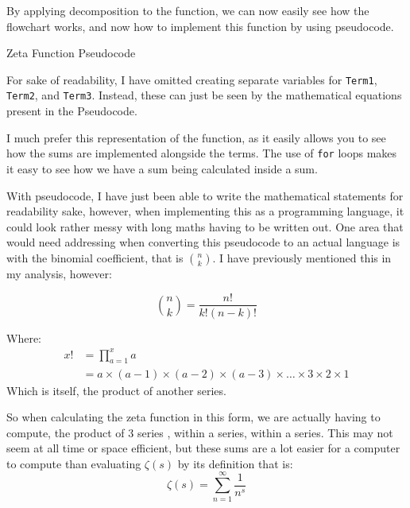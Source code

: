 \documentclass{article}
\begin{document}
By applying decomposition to the function, we can now easily see how the flowchart works, and now how to implement this function by using pseudocode.
\clearpage
\begin{algorithm}[h]
    \caption{Zeta Function Pseudocode}
    \begin{algorithmic}
                \State{ \Return {$\infty$}}
            \Else
                    \EndFor
                \EndFor
                \State {}
            \EndIf
        \EndFunction
    \end{algorithmic}
\end{algorithm}

For sake of readability, I have omitted creating separate variables for \texttt{Term1}, \texttt{Term2}, and \texttt{Term3}. Instead, these can just be seen by the mathematical equations present in the Pseudocode.

I much prefer this representation of the function, as it easily allows you to see how the sums are implemented alongside the terms. The use of \texttt{for} loops makes it easy to see how we have a sum being calculated inside a sum.

With pseudocode, I have just been able to write the mathematical statements for readability sake, however, when implementing this as a programming language, it could look rather messy with long maths having to be written out.
One area that would need addressing when converting this pseudocode to an actual language is with the binomial coefficient, that is $\binom{n}{k}$. I have previously mentioned this in my analysis, however:

$$\binom{n}{k} = \frac{n!}{k!(n-k)!}$$

Where:
\begin{align*}
    x! &= \prod_{a=1}^x a\\
    &= a \times (a-1) \times (a-2) \times (a-3) \times \dots \times 3 \times 2 \times 1
\end{align*}
Which is itself, the product of another series.

So when calculating the zeta function in this form, we are actually having to compute, the product of 3 series , within a series, within a series. This may not seem at all time or space efficient, but these sums are a lot easier for a computer to compute than evaluating $\zeta(s)$ by its definition that is:
$$\zeta(s) = \sum^{\infty}_{n=1} \frac{1}{n^s}$$
\end{document}
